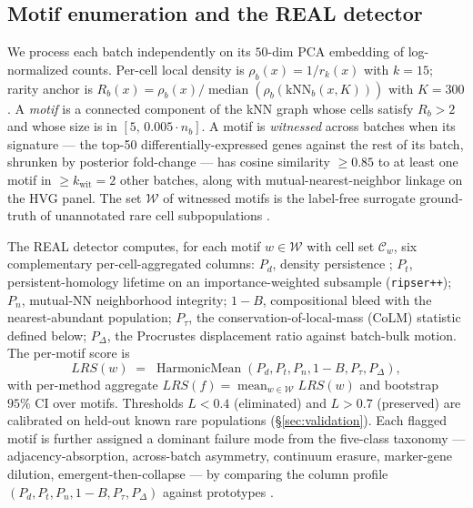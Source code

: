 
\subsection*{Motif enumeration and the REAL detector}
\label{sec:methods-real}

We process each batch independently on its $50$-dim PCA embedding of log-normalized counts. Per-cell local density is $\rho_b(x) = 1/r_k(x)$ with $k=15$; rarity anchor is $R_b(x) = \rho_b(x) / \operatorname{median}(\rho_b(\text{kNN}_b(x, K)))$ with $K=300$. A \emph{motif} is a connected component of the kNN graph whose cells satisfy $R_b > 2$ and whose size is in $[5,\,0.005\cdot n_b]$. A motif is \emph{witnessed} across batches when its signature --- the top-50 differentially-expressed genes against the rest of its batch, shrunken by posterior fold-change \citep{lopez2018scvi} --- has cosine similarity $\ge 0.85$ to at least one motif in $\ge k_\text{wit}=2$ other batches, along with mutual-nearest-neighbor linkage on the HVG panel. The set $\mathcal{W}$ of witnessed motifs is the label-free surrogate ground-truth of unannotated rare cell subpopulations \citep{ds2026lrs}.

The REAL detector computes, for each motif $w\in\mathcal{W}$ with cell set $\mathcal{C}_w$, six complementary per-cell-aggregated columns: $P_d$, density persistence \citep{ds2026lrs}; $P_t$, persistent-homology lifetime on an importance-weighted subsample (\texttt{ripser++}); $P_n$, mutual-NN neighborhood integrity; $1-B$, compositional bleed with the nearest-abundant population; $P_\tau$, the conservation-of-local-mass (CoLM) statistic defined below; $P_\Delta$, the Procrustes displacement ratio against batch-bulk motion. The per-motif score is
\[
  LRS(w) \;=\; \operatorname{HarmonicMean}(P_d, P_t, P_n, 1-B, P_\tau, P_\Delta),
\]
with per-method aggregate $LRS(f) = \operatorname{mean}_{w\in\mathcal{W}} LRS(w)$ and bootstrap $95\%$ CI over motifs. Thresholds $L<0.4$ (eliminated) and $L>0.7$ (preserved) are calibrated on held-out known rare populations (\S\ref{sec:validation}). Each flagged motif is further assigned a dominant failure mode from the five-class taxonomy --- adjacency-absorption, across-batch asymmetry, continuum erasure, marker-gene dilution, emergent-then-collapse --- by comparing the column profile $(P_d, P_t, P_n, 1-B, P_\tau, P_\Delta)$ against prototypes \citep{immuno2026catalog}.

